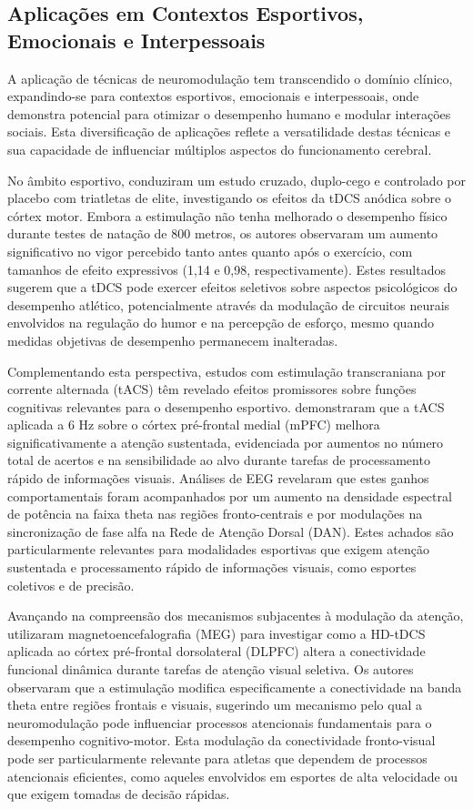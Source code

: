 \subsection{Aplicações em Contextos Esportivos, Emocionais e Interpessoais}
A aplicação de técnicas de neuromodulação tem transcendido o domínio clínico, expandindo-se para contextos esportivos, emocionais e interpessoais, onde demonstra potencial para otimizar o desempenho humano e modular interações sociais. Esta diversificação de aplicações reflete a versatilidade destas técnicas e sua capacidade de influenciar múltiplos aspectos do funcionamento cerebral.

No âmbito esportivo,  conduziram um estudo cruzado, duplo-cego e controlado por placebo com triatletas de elite, investigando os efeitos da tDCS anódica sobre o córtex motor. Embora a estimulação não tenha melhorado o desempenho físico durante testes de natação de 800 metros, os autores observaram um aumento significativo no vigor percebido tanto antes quanto após o exercício, com tamanhos de efeito expressivos (1,14 e 0,98, respectivamente). Estes resultados sugerem que a tDCS pode exercer efeitos seletivos sobre aspectos psicológicos do desempenho atlético, potencialmente através da modulação de circuitos neurais envolvidos na regulação do humor e na percepção de esforço, mesmo quando medidas objetivas de desempenho permanecem inalteradas.

Complementando esta perspectiva, estudos com estimulação transcraniana por corrente alternada (tACS) têm revelado efeitos promissores sobre funções cognitivas relevantes para o desempenho esportivo.  demonstraram que a tACS aplicada a 6 Hz sobre o córtex pré-frontal medial (mPFC) melhora significativamente a atenção sustentada, evidenciada por aumentos no número total de acertos e na sensibilidade ao alvo durante tarefas de processamento rápido de informações visuais. Análises de EEG revelaram que estes ganhos comportamentais foram acompanhados por um aumento na densidade espectral de potência na faixa theta nas regiões fronto-centrais e por modulações na sincronização de fase alfa na Rede de Atenção Dorsal (DAN). Estes achados são particularmente relevantes para modalidades esportivas que exigem atenção sustentada e processamento rápido de informações visuais, como esportes coletivos e de precisão.

Avançando na compreensão dos mecanismos subjacentes à modulação da atenção,  utilizaram magnetoencefalografia (MEG) para investigar como a HD-tDCS aplicada ao córtex pré-frontal dorsolateral (DLPFC) altera a conectividade funcional dinâmica durante tarefas de atenção visual seletiva. Os autores observaram que a estimulação modifica especificamente a conectividade na banda theta entre regiões frontais e visuais, sugerindo um mecanismo pelo qual a neuromodulação pode influenciar processos atencionais fundamentais para o desempenho cognitivo-motor. Esta modulação da conectividade fronto-visual pode ser particularmente relevante para atletas que dependem de processos atencionais eficientes, como aqueles envolvidos em esportes de alta velocidade ou que exigem tomadas de decisão rápidas.

